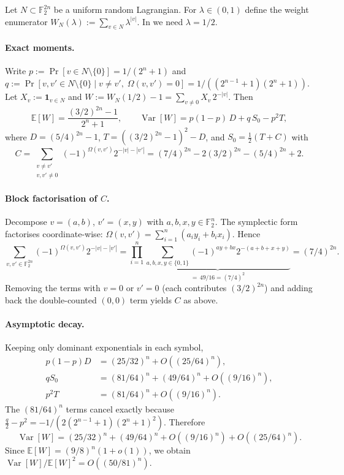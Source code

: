 \documentclass[11pt,a4paper]{article}
\theoremstyle{plain}
\theoremstyle{definition}
\newcommand{\F}{\mathbb{F}}
\newcommand{\E}{\mathbb{E}}
\DeclareMathOperator{\Var}{Var}
\begin{document}
Let $N \subset \F_2^{2n}$ be a uniform random Lagrangian.  For $\lambda \in (0,1)$ define the weight enumerator $W_N(\lambda) := \sum_{v \in N} \lambda^{|v|}$.  In  we need $\lambda=1/2$.

\paragraph{Exact moments.}  Write $p := \Pr[v \in N \setminus \{0\}] = 1/(2^n+1)$ and $q := \Pr[v,v' \in N \setminus \{0\} \mid v \neq v',\; \Omega(v,v')=0] = 1/((2^{n-1}+1)(2^n+1))$.  Let $X_v := \mathbf{1}_{v \in N}$ and $W := W_N(1/2)-1 = \sum_{v \neq 0} X_v\,2^{-|v|}$.  Then
\[
\E[W] = \frac{(3/2)^{2n}-1}{2^n+1}, \qquad
\Var[W] = p(1-p)\,D + q\,S_0 - p^2 T,
\]
where $D = (5/4)^{2n}-1$, $T = ((3/2)^{2n}-1)^2-D$, and $S_0 = \tfrac12(T+C)$ with
\[
C = \sum_{\substack{v\neq v'\\ v,v'\neq 0}} (-1)^{\Omega(v,v')}2^{-|v|-|v'|}
  = (7/4)^{2n} - 2(3/2)^{2n} - (5/4)^{2n} + 2.
\]

\paragraph{Block factorisation of $C$.}  Decompose $v=(a,b)$, $v'=(x,y)$ with $a,b,x,y \in \F_2^n$.  The symplectic form factorises coordinate-wise: $\Omega(v,v') = \sum_{i=1}^n (a_i y_i + b_i x_i)$.  Hence
\[
\sum_{v,v' \in \F_2^{2n}} (-1)^{\Omega(v,v')} 2^{-|v|-|v'|}
= \prod_{i=1}^n \underbrace{\sum_{a,b,x,y\in\{0,1\}} (-1)^{ay+bx} 2^{-(a+b+x+y)}}_{=\,49/16 = (7/4)^2}
= (7/4)^{2n}.
\]
Removing the terms with $v=0$ or $v'=0$ (each contributes $(3/2)^{2n}$) and adding back the double-counted $(0,0)$ term yields $C$ as above.

\paragraph{Asymptotic decay.}  Keeping only dominant exponentials in each symbol,
\begin{align*}
p(1-p)D &= (25/32)^n + O((25/64)^n), \\
qS_0 &= (81/64)^n + (49/64)^n + O((9/16)^n), \\
p^2T &= (81/64)^n + O((9/16)^n).
\end{align*}
The $(81/64)^n$ terms cancel exactly because $\tfrac{q}{2}-p^2 = -1/(2(2^{n-1}+1)(2^n+1)^2)$.  Therefore
\[
\Var[W] = (25/32)^n + (49/64)^n + O((9/16)^n) + O((25/64)^n).
\]
Since $\E[W] = (9/8)^n(1+o(1))$, we obtain $\Var[W]/\E[W]^2 = O((50/81)^n)$.
\end{document}
